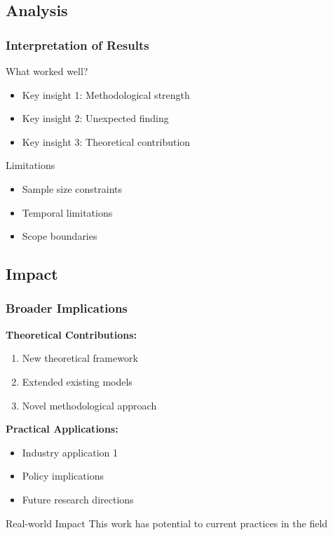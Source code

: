 \subsection{Analysis}
\begin{frame}
    \frametitle{Interpretation of Results}
    \begin{block}{What worked well?}
        \begin{itemize}
            \item Key insight 1: Methodological strength
            \item Key insight 2: Unexpected finding
            \item Key insight 3: Theoretical contribution
        \end{itemize}
    \end{block}
    
    \begin{alertblock}{Limitations}
        \begin{itemize}
            \item Sample size constraints
            \item Temporal limitations
            \item Scope boundaries
        \end{itemize}
    \end{alertblock}
\end{frame}

\subsection{Impact}
\begin{frame}
    \frametitle{Broader Implications}
    \textbf{Theoretical Contributions:}
    \begin{enumerate}
        \item New theoretical framework
        \item Extended existing models
        \item Novel methodological approach
    \end{enumerate}
    
    \vspace{1em}
    \textbf{Practical Applications:}
    \begin{itemize}
        \item Industry application 1
        \item Policy implications
        \item Future research directions
    \end{itemize}
    
    \vspace{1em}
    \begin{exampleblock}{Real-world Impact}
        This work has potential to  current practices in the field
    \end{exampleblock}
\end{frame}

